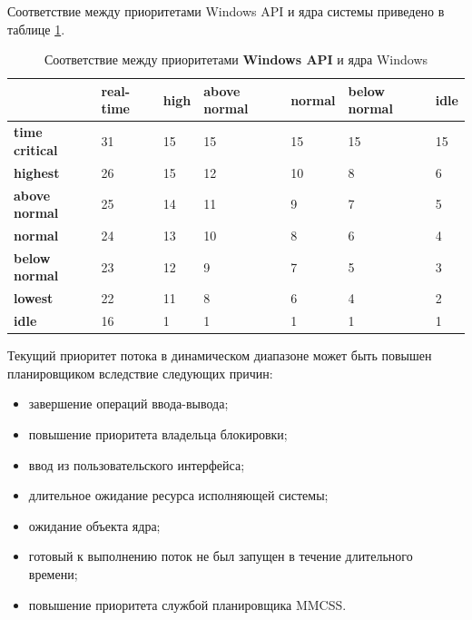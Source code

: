 Соответствие между приоритетами Windows API и ядра системы приведено в таблице \ref{tbl:priority}.


\begin{table}[h]
	\caption{Соответствие между приоритетами \textbf{Windows API} и ядра Windows}
	\begin{center}
		\begin{tabular}{|l|p{45pt}|p{45pt}|p{45pt}|p{45pt}|p{45pt}|p{45pt}|}
			\hline
			{} & \textbf{real-time} & \textbf{high} & \textbf{above normal} & \textbf{normal} & \textbf{below normal} & \textbf{idle}\\
			\hline
			\textbf{time critical} & 31 & 15 & 15 & 15 & 15 & 15 \\
			\hline
			\textbf{highest} & 26 & 15 & 12 & 10 & 8 & 6 \\
			\hline
			\textbf{above normal} & 25 & 14 & 11 & 9 & 7 & 5 \\
			\hline
			\textbf{normal} & 24 & 13 & 10 & 8 & 6 & 4 \\
			\hline
			\textbf{below normal} & 23 & 12 & 9 & 7 & 5 & 3 \\
			\hline
			\textbf{lowest} & 22 & 11 & 8 & 6 & 4 & 2 \\
			\hline
			\textbf{idle} & 16 & 1 & 1 & 1 & 1 & 1 \\
			\hline
		\end{tabular}
	\end{center}
	\label{tbl:priority}
\end{table}

Текущий приоритет потока в динамическом диапазоне может быть повышен планировщиком вследствие следующих причин:

\begin{itemize}
	\item завершение операций ввода-вывода;
	\item повышение приоритета владельца блокировки;
	\item ввод из пользовательского интерфейса;
	\item длительное ожидание ресурса исполняющей системы;
	\item ожидание объекта ядра;
	\item готовый к выполнению поток не был запущен в течение длительного времени;
	\item повышение приоритета службой планировщика MMCSS.
\end{itemize}

